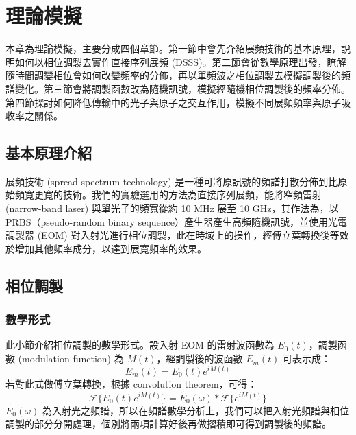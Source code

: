 \documentclass[class=NCU_thesis, crop=false]{standalone}
\begin{document}
\chapter{理論模擬}
本章為理論模擬，主要分成四個章節。第一節中會先介紹展頻技術的基本原理，說明如何以相位調製去實作直接序列展頻 (DSSS)。第二節會從數學原理出發，瞭解隨時間調變相位會如何改變頻率的分佈，再以單頻波之相位調製去模擬調製後的頻譜變化。第三節會將調製函數改為隨機訊號，模擬經隨機相位調製後的頻率分佈。第四節探討如何降低傳輸中的光子與原子之交互作用，模擬不同展頻頻率與原子吸收率之關係。


\section{基本原理介紹}
展頻技術 (spread spectrum technology) 是一種可將原訊號的頻譜打散分佈到比原始頻寬更寬的技術。我們的實驗選用的方法為直接序列展頻，能將窄頻雷射 (narrow-band laser) 與單光子的頻寬從約 10 MHz 展至 10 GHz，其作法為，以 PRBS（pseudo-random binary sequence）產生器產生高頻隨機訊號，並使用光電調製器 (EOM) 對入射光進行相位調製，此在時域上的操作，經傅立葉轉換後等效於增加其他頻率成分，以達到展寬頻率的效果。

\section{相位調製}

\subsection{數學形式}
此小節介紹相位調製的數學形式。設入射 EOM 的雷射波函數為 $E_{0}(t)$，調製函數 (modulation function) 為 $M(t)$，經調製後的波函數 $E_{m}(t)$ 可表示成：
\begin{equation}
    E_{m}(t)=E_{0}(t)e^{iM(t)}
\end{equation}
若對此式做傅立葉轉換，根據 convolution theorem，可得：
\begin{equation}
\label{eq:modulation_function}
    \mathscr{F}\{E_{0}(t)e^{iM(t)}\}=\tilde{E_{0}}(\omega)*\mathscr{F}\{{e^{iM(t)}}\}
\end{equation}
$\tilde{E_{0}}(\omega)$ 為入射光之頻譜，所以在頻譜數學分析上，我們可以把入射光頻譜與相位調製的部分分開處理，個別將兩項計算好後再做摺積即可得到調製後的頻譜。
\end{document}
